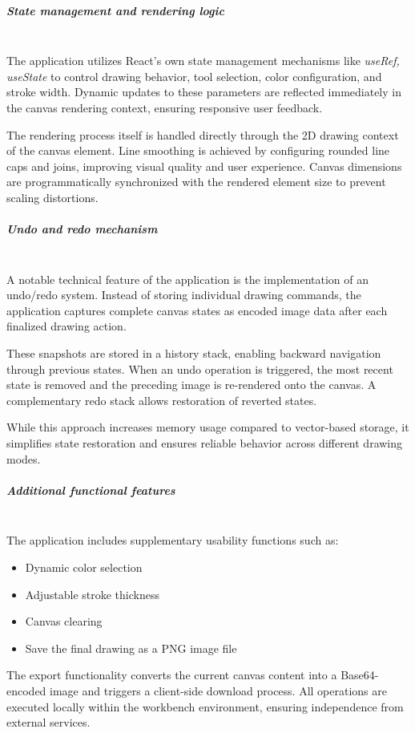 \documentclass[a4paper,12pt]{article}
\begin{document}
\newpage
\subparagraph{State management and rendering logic}\mbox{} \\
The application utilizes React’s own state management mechanisms like \textit{useRef, useState}\cite{react} to control drawing behavior, tool selection, color configuration, and stroke width. Dynamic updates to these parameters are reflected immediately in the canvas rendering context, ensuring responsive user feedback.

The rendering process itself is handled directly through the 2D drawing context of the canvas element. Line smoothing is achieved by configuring rounded line caps and joins, improving visual quality and user experience. Canvas dimensions are programmatically synchronized with the rendered element size to prevent scaling distortions.

\subparagraph{Undo and redo mechanism} \mbox{} \\
A notable technical feature of the application is the implementation of an undo/redo system. Instead of storing individual drawing commands, the application captures complete canvas states as encoded image data after each finalized drawing action.

These snapshots are stored in a history stack, enabling backward navigation through previous states. When an undo operation is triggered, the most recent state is removed and the preceding image is re-rendered onto the canvas. A complementary redo stack allows restoration of reverted states.

While this approach increases memory usage compared to vector-based storage, it simplifies state restoration and ensures reliable behavior across different drawing modes.

\subparagraph{Additional functional features}\mbox{} \\
The application includes supplementary usability functions such as:
\begin{itemize}
    \item Dynamic color selection
    \item Adjustable stroke thickness
    \item Canvas clearing
    \item Save the final drawing as a PNG image file
\end{itemize}

The export functionality converts the current canvas content into a Base64-encoded image and triggers a client-side download process. All operations are executed locally within the workbench environment, ensuring independence from external services.
\end{document}
